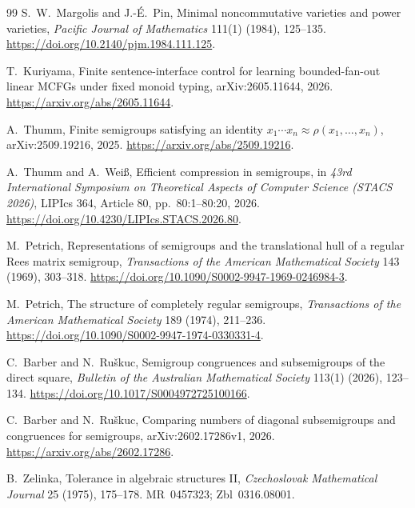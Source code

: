 \documentclass[10pt,a4paper]{article}
\theoremstyle{definition}
\theoremstyle{remark}
\begin{document}
\begin{thebibliography}{99}
S.~W.~Margolis and J.-\'E.~Pin,
\newblock Minimal noncommutative varieties and power varieties,
\newblock \emph{Pacific Journal of Mathematics} 111(1) (1984), 125--135.
\newblock \url{https://doi.org/10.2140/pjm.1984.111.125}.



T.~Kuriyama,
\newblock Finite sentence-interface control for learning bounded-fan-out linear MCFGs under fixed monoid typing,
\newblock arXiv:2605.11644, 2026.
\newblock \url{https://arxiv.org/abs/2605.11644}.

A.~Thumm,
\newblock Finite semigroups satisfying an identity
\(x_1\cdots x_n\approx\rho(x_1,\ldots,x_n)\),
\newblock arXiv:2509.19216, 2025.
\newblock \url{https://arxiv.org/abs/2509.19216}.

A.~Thumm and A.~Wei\ss,
\newblock Efficient compression in semigroups,
\newblock in \emph{43rd International Symposium on Theoretical Aspects of
Computer Science (STACS 2026)}, LIPIcs 364, Article 80, pp.~80:1--80:20,
2026.
\newblock \url{https://doi.org/10.4230/LIPIcs.STACS.2026.80}.

M.~Petrich,
\newblock Representations of semigroups and the translational hull of a
regular Rees matrix semigroup,
\newblock \emph{Transactions of the American Mathematical Society}
143 (1969), 303--318.
\newblock \url{https://doi.org/10.1090/S0002-9947-1969-0246984-3}.



M.~Petrich,
\newblock The structure of completely regular semigroups,
\newblock \emph{Transactions of the American Mathematical Society}
189 (1974), 211--236.
\newblock \url{https://doi.org/10.1090/S0002-9947-1974-0330331-4}.



C.~Barber and N.~Ru\v{s}kuc,
\newblock Semigroup congruences and subsemigroups of the direct square,
\newblock \emph{Bulletin of the Australian Mathematical Society}
113(1) (2026), 123--134.
\newblock \url{https://doi.org/10.1017/S0004972725100166}.


C.~Barber and N.~Ru\v{s}kuc,
\newblock Comparing numbers of diagonal subsemigroups and congruences for semigroups,
\newblock arXiv:2602.17286v1, 2026.
\newblock \url{https://arxiv.org/abs/2602.17286}.

B.~Zelinka,
\newblock Tolerance in algebraic structures II,
\newblock \emph{Czechoslovak Mathematical Journal} 25 (1975), 175--178.
\newblock MR~0457323; Zbl~0316.08001.


\end{thebibliography}
\end{document}
